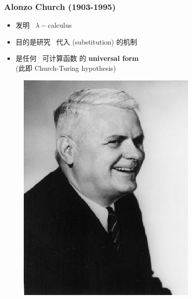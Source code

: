 \documentclass[15pt]{beamer}
\begin{document}
\begin{frame}
\frametitle{Alonzo Church (1903-1995)}
\begin{minipage}[t]{0.55\linewidth}
	\begin{itemize}
		\item 发明 {\color{red} \ $\lambda-$calculus}
		\item 目的是研究 {\color{red} \ 代入} (substitution) 的机制
		\item 是任何 {\color{red} \ 可计算函数} 的 \textbf{universal form}\\
		(此即 Church-Turing hypothesis)
	\end{itemize}
\end{minipage}
\hfill
\begin{minipage}[t]{0.4\linewidth}
	\begin{figure}[H]
		\includegraphics[scale=0.4]{Church.jpg}
	\end{figure}
\end{minipage}
\end{frame}
\end{document}
